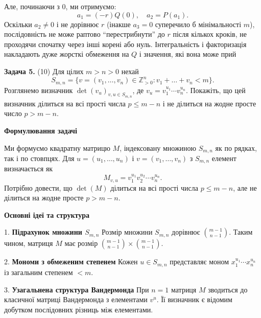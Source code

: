 \documentclass{article}
\begin{document}
   Але, починаючи з 0, ми отримуємо:
   \[
   a_1 = (-r)Q(0), \quad a_2 = P(a_1).
   \]
   Оскільки \( a_2 \neq 0 \) і не дорівнює \( r \) (інакше \( a_3 = 0 \) суперечило б мінімальності \( m \)), послідовність не може раптово “перестрибнути” до \( r \) після кількох кроків, не проходячи спочатку через інші корені або нуль. Інтегральність і факторизація накладають дуже жорсткі обмеження на \( Q \) і значення, які вона може прий



\bigskip

\noindent\textbf{Задача 5.} (10) Для цілих \( m > n > 0 \) нехай  
\[
S_{m,n} = \{ v = (v_1, \dots, v_n) \in \mathbb{Z}_{>0}^n : v_1 + \dots + v_n < m \}.
\]  
Розглянемо визначник \( \det(v_u)_{v,u \in S_{m,n}} \), де \( v_u = v_1^{u_1} \cdots v_n^{u_n} \). Покажіть, що цей визначник ділиться на всі прості числа \( p \leq m - n \) і не ділиться на жодне просте число \( p > m - n \).

\textbf{Формулювання задачі}

Ми формуємо квадратну матрицю \( M \), індексовану множиною \( S_{m,n} \) як по рядках, так і по стовпцях. Для \( u=(u_1,\dots,u_n)\) і \( v=(v_1,\dots,v_n) \) з \( S_{m,n} \) елемент визначається як  
\[
M_{v,u} = v_1^{u_1} v_2^{u_2} \cdots v_n^{u_n}.
\]  
Потрібно довести, що \(\det(M)\) ділиться на всі прості числа \( p \leq m - n \), але не ділиться на жодне просте \( p > m - n \).

\bigskip

\textbf{Основні ідеї та структура}

1. \textbf{Підрахунок множини \( S_{m,n} \)}  
   Розмір множини \( S_{m,n} \) дорівнює \(\binom{m-1}{n-1}\). Таким чином, матриця \( M \) має розмір \(\binom{m-1}{n-1} \times \binom{m-1}{n-1}\).

2. \textbf{Мономи з обмеженим степенем}  
   Кожен \( u \in S_{m,n} \) представляє моном \( x_1^{u_1}\cdots x_n^{u_n} \) із загальним степенем \( < m \).

3. \textbf{Узагальнена структура Вандермонда}  
   При \( n=1 \) матриця \( M \) зводиться до класичної матриці Вандермонда з елементами \( v^u \). Її визначник є відомим добутком послідовних різниць між елементами.
\end{document}
